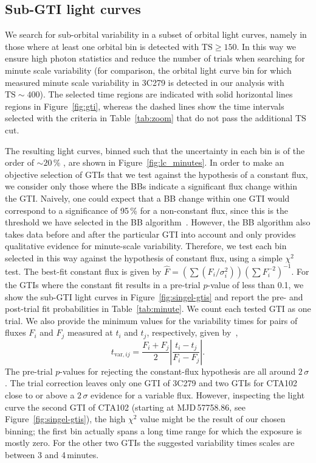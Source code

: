 \documentclass[twocolumn,linenumbers]{aastex62}
\begin{document}
\subsection{Sub-GTI light curves}
\label{sec:sub-gti}
We search for sub-orbital variability in a subset of orbital light curves, namely in those where at least one orbital bin is detected with $\mathrm{TS} \geqslant 150$. 
In this way we ensure high photon statistics and reduce the number of trials when searching for minute scale variability (for comparison, the orbital light curve bin for which \citet{TheFermi-LAT:2016dss} measured minute scale variability in 3C279 is detected in our analysis with $\mathrm{TS} \sim 400$). 
The selected time regions are indicated with solid horizontal lines regions in Figure~\ref{fig:gti}, whereas the dashed lines show the time intervals selected with the criteria in Table~\ref{tab:zoom} that do not pass the additional $\mathrm{TS}$ cut.

The resulting light curves, binned such that the uncertainty in each bin is of the order of $\sim20\,\%$ \citep[using the adaptive binning introduced by][]{lott2012}, are shown in Figure~\ref{fig:lc_minutes}. 
In order to make an objective selection of GTIs that we test against the hypothesis of a constant flux, we consider only those where the BBs indicate a significant flux change within the GTI.
Naively, one could expect that a BB change within one GTI would correspond to a significance of 95\,\% for a non-constant flux, since this is the threshold we have selected in the BB algorithm~\citep{2013ApJ...764..167S}. However, the BB algorithm also takes data before and after the particular GTI into account and only provides qualitative evidence for minute-scale variability. 
Therefore, we test each bin selected in this way against the hypothesis of constant flux, using a simple $\chi^2$ test. 
The best-fit constant flux is given by $\hat{F} = (\sum (F_i / \sigma_i^2))(\sum F_i^{-2})^{-1}$. 
For the GTIs where the constant fit results in a pre-trial $p$-value of less than 0.1, we show the sub-GTI light curves in Figure~\ref{fig:singel-gtis} and report the pre- and post-trial fit probabilities in Table~\ref{tab:minute}.
We count each tested GTI as one trial. 
We also provide the minimum values for the variability times for pairs of fluxes $F_i$ and $F_j$ measured at $t_i$ and $t_j$, respectively, given by~\citet{1999ApJ...527..719Z},
\begin{equation}
t_{\mathrm{var},ij} = \frac{F_i + F_j}{2}\left|\frac{t_i - t_j}{F_i - F_j}\right|.
\end{equation}
The pre-trial $p$-values for rejecting the constant-flux hypothesis are all around $2\,\sigma$. 
The trial correction leaves only one GTI of 3C279 and two GTIs for CTA102 close to or above a $2\,\sigma$ evidence for a variable flux. 
However, inspecting the light curve the second GTI of CTA102 (starting at MJD\,57758.86, see Figure~\ref{fig:singel-gtis}), the high $\chi^2$ value might be the result of our chosen binning; the first bin actually spans a long time range for which the exposure is mostly zero.  
For the other two GTIs the suggested variability times scales are between 3 and 4\,minutes.
\end{document}
